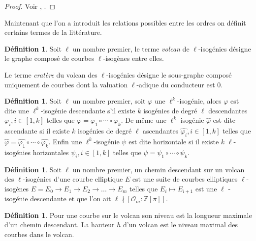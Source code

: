 \documentclass[10pt,a4paper]{book}
\theoremstyle{plain}
\theoremstyle{definition}
\theoremstyle{definition}
\theoremstyle{definition}
\theoremstyle{definition}
\theoremstyle{definition}
\newtheorem{defi}[thm]{Définition}
\theoremstyle{remark}
\theoremstyle{remark}
\theoremstyle{definition}
\begin{document}
\begin{proof}
Voir \cite[§4]{FouquetMorain02}, \cite[Proposition 23]{Kohel96}.
\end{proof}

Maintenant que l'on a introduit les relations possibles entre les ordres on définit certains termes de la littérature.

\begin{defi}
Soit $\ell$ un nombre premier, le terme \emph{volcan} de $\ell$-isogénies 
désigne le graphe composé de courbes $\ell$-isogènes entre elles.

Le terme \emph{cratère} du volcan des $\ell$-isogénies désigne le sous-graphe composé uniquement de courbes dont la valuation $\ell$-adique du conducteur est $0$.
\end{defi}

\begin{defi}
Soit $\ell$ un nombre premier, soit $\varphi$ une $\ell^k$-isogénie, alors
$\varphi$ est dite une $\ell^k$-isogénie descendante s'il existe $k$ 
isogénies de degré $\ell$ descendantes $\varphi_i, i \in [1,k]$ telles que 
$\varphi=\varphi_1 \circ \cdots \circ \varphi_k$. De même une 
$\ell^k$-isogénie $\widehat{\varphi}$ est dite ascendante si il existe $k$ 
isogénies de degré $\ell$ ascendantes $\widehat{\varphi_i}, i \in [1,k]$ 
telles que $\widehat{\varphi}=\widehat{\varphi_1} \circ \cdots \circ 
\widehat{\varphi_k}$. Enfin une $\ell^k$-isogénie $\psi$ est dite horizontale 
si il existe $k$ $\ell$-isogénies horizontales $\psi_i, i \in [1,k]$ telles 
que $\psi=\psi_1 \circ \cdots \circ \psi_k$.
\end{defi}

\begin{defi}
Soit $\ell$ un nombre premier, un chemin descendant sur un volcan des $\ell$-isogénies d'une courbe elliptique $E$ est une suite de courbes elliptiques $\ell$-isogènes $E=E_0 \rightarrow E_1 \rightarrow E_2 \rightarrow ... \rightarrow E_m$ telles que $E_i \mapsto E_{i+1}$ est une $\ell$ -isogénie descendante et que l'on ait $\ell \nmid [ \mathcal{O}_m : \mathbb{Z}[\pi]]$. 
\end{defi}

\begin{defi}
\label{def:haut:vol}
Pour une courbe sur le volcan son niveau est la longueur maximale d'un chemin descendant.
\newline
La hauteur $h$ d'un volcan est le niveau maximal des courbes dans le volcan.
\end{defi}
 
\end{document}
